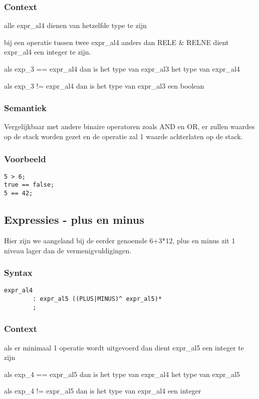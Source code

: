 \documentclass[]{article}
\begin{document}
\subsubsection{Context}
\begin{list}{•}{•}
\item alle expr\_al4 dienen van hetzelfde type te zijn
\item bij een operatie tussen twee expr\_al4 anders dan RELE \& RELNE dient expr\_al4 een integer te zijn.
\item als exp\_3 == expr\_al4 dan is het type van expr\_al3 het type van expr\_al4
\item als exp\_3 != expr\_al4 dan is het type van expr\_al3 een boolean
\end{list}
\subsubsection{Semantiek}
Vergelijkbaar met andere binaire operatoren zoals AND en OR, er zullen waardes op de stack worden gezet en de operatie zal 1 waarde achterlaten op de stack.
\subsubsection{Voorbeeld}
\begin{lstlisting}[style=SELMA]
5 > 6;
true == false;
5 == 42;
\end{lstlisting}

\subsection{Expressies - plus en minus}
Hier zijn we aangeland bij de eerder genoemde 6+3*12, plus en minus zit 1 niveau lager dan de vermenigvuldigingen.
\subsubsection{Syntax}
\begin{lstlisting}[style=ANTLR]
	expr_al4
		: expr_al5 ((PLUS|MINUS)^ expr_al5)*
		;
\end{lstlisting}
\subsubsection{Context}
\begin{list}{•}{•}
\item als er minimaal 1 operatie wordt uitgevoerd dan dient expr\_al5 een integer te zijn
\item als exp\_4 == expr\_al5 dan is het type van expr\_al4 het type van expr\_al5
\item als exp\_4 != expr\_al5 dan is het type van expr\_al4 een integer
\end{list}
\end{document}
